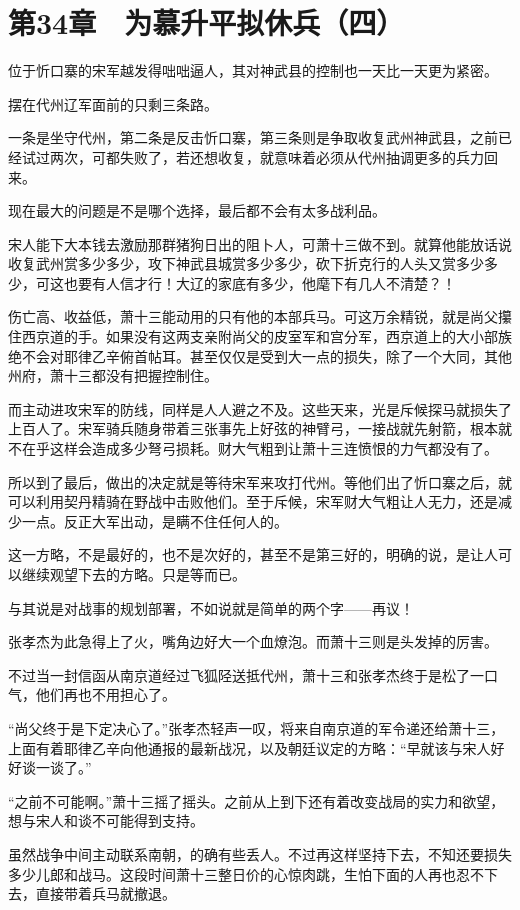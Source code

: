 \section{第34章　为慕升平拟休兵（四）}

位于忻口寨的宋军越发得咄咄逼人，其对神武县的控制也一天比一天更为紧密。

摆在代州辽军面前的只剩三条路。

一条是坐守代州，第二条是反击忻口寨，第三条则是争取收复武州神武县，之前已经试过两次，可都失败了，若还想收复，就意味着必须从代州抽调更多的兵力回来。

现在最大的问题是不是哪个选择，最后都不会有太多战利品。

宋人能下大本钱去激励那群猪狗日出的阻卜人，可萧十三做不到。就算他能放话说收复武州赏多少多少，攻下神武县城赏多少多少，砍下折克行的人头又赏多少多少，可这也要有人信才行！大辽的家底有多少，他麾下有几人不清楚？！

伤亡高、收益低，萧十三能动用的只有他的本部兵马。可这万余精锐，就是尚父攥住西京道的手。如果没有这两支亲附尚父的皮室军和宫分军，西京道上的大小部族绝不会对耶律乙辛俯首帖耳。甚至仅仅是受到大一点的损失，除了一个大同，其他州府，萧十三都没有把握控制住。

而主动进攻宋军的防线，同样是人人避之不及。这些天来，光是斥候探马就损失了上百人了。宋军骑兵随身带着三张事先上好弦的神臂弓，一接战就先射箭，根本就不在乎这样会造成多少弩弓损耗。财大气粗到让萧十三连愤恨的力气都没有了。

所以到了最后，做出的决定就是等待宋军来攻打代州。等他们出了忻口寨之后，就可以利用契丹精骑在野战中击败他们。至于斥候，宋军财大气粗让人无力，还是减少一点。反正大军出动，是瞒不住任何人的。

这一方略，不是最好的，也不是次好的，甚至不是第三好的，明确的说，是让人可以继续观望下去的方略。只是等而已。

与其说是对战事的规划部署，不如说就是简单的两个字——再议！

张孝杰为此急得上了火，嘴角边好大一个血燎泡。而萧十三则是头发掉的厉害。

不过当一封信函从南京道经过飞狐陉送抵代州，萧十三和张孝杰终于是松了一口气，他们再也不用担心了。

“尚父终于是下定决心了。”张孝杰轻声一叹，将来自南京道的军令递还给萧十三，上面有着耶律乙辛向他通报的最新战况，以及朝廷议定的方略：“早就该与宋人好好谈一谈了。”

“之前不可能啊。”萧十三摇了摇头。之前从上到下还有着改变战局的实力和欲望，想与宋人和谈不可能得到支持。

虽然战争中间主动联系南朝，的确有些丢人。不过再这样坚持下去，不知还要损失多少儿郎和战马。这段时间萧十三整日价的心惊肉跳，生怕下面的人再也忍不下去，直接带着兵马就撤退。

